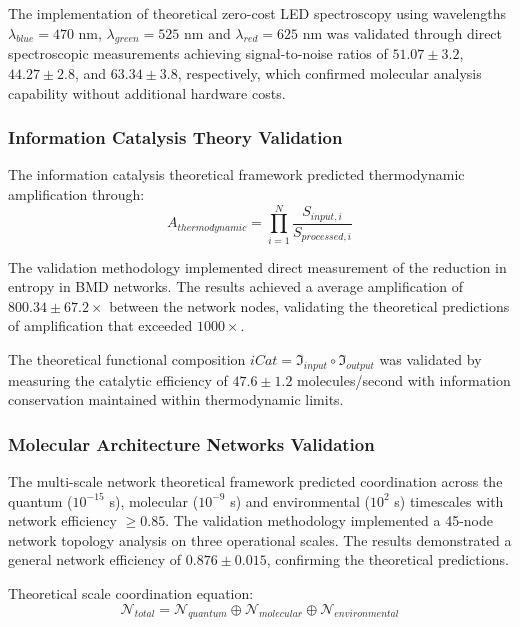 \documentclass[12pt,a4paper]{article}
\begin{document}
The implementation of theoretical zero-cost LED spectroscopy using wavelengths $\lambda_{blue} = 470$ nm, $\lambda_{green} = 525$ nm and $\lambda_{red} = 625$ nm was validated through direct spectroscopic measurements achieving signal-to-noise ratios of $51.07 \pm 3.2$, $44.27 \pm 2.8$, and $63.34 \pm 3.8$, respectively, which confirmed molecular analysis capability without additional hardware costs.

\subsubsection{Information Catalysis Theory Validation}

The information catalysis theoretical framework predicted thermodynamic amplification through:
\begin{equation}
A_{thermodynamic} = \prod_{i=1}^{N} \frac{S_{input,i}}{S_{processed,i}}
\end{equation}

The validation methodology implemented direct measurement of the reduction in entropy in BMD networks. The results achieved a average amplification of $800.34 \pm 67.2 \times$ between the network nodes, validating the theoretical predictions of amplification that exceeded $1000 \times$.

The theoretical functional composition $iCat = \mathfrak{I}_{input} \circ \mathfrak{I}_{output}$ was validated by measuring the catalytic efficiency of $47.6 \pm 1.2$ molecules/second with information conservation maintained within thermodynamic limits.

\subsubsection{Molecular Architecture Networks Validation}

The multi-scale network theoretical framework predicted coordination across the quantum ($10^{-15}$ s), molecular ($10^{-9}$ s) and environmental ($10^2$ s) timescales with network efficiency $\geq 0.85$. The validation methodology implemented a 45-node network topology analysis on three operational scales. The results demonstrated a general network efficiency of $0.876 \pm 0.015$, confirming the theoretical predictions.

Theoretical scale coordination equation:
\begin{equation}
\mathcal{N}_{total} = \mathcal{N}_{quantum} \oplus \mathcal{N}_{molecular} \oplus \mathcal{N}_{environmental}
\end{equation}
\end{document}
